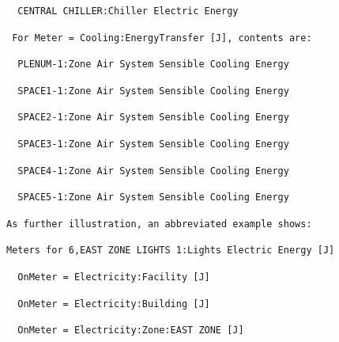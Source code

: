 \begin{lstlisting}
  CENTRAL CHILLER:Chiller Electric Energy
\end{lstlisting}

\begin{lstlisting}
 For Meter = Cooling:EnergyTransfer [J], contents are:
\end{lstlisting}

\begin{lstlisting}
  PLENUM-1:Zone Air System Sensible Cooling Energy
\end{lstlisting}

\begin{lstlisting}
  SPACE1-1:Zone Air System Sensible Cooling Energy
\end{lstlisting}

\begin{lstlisting}
  SPACE2-1:Zone Air System Sensible Cooling Energy
\end{lstlisting}

\begin{lstlisting}
  SPACE3-1:Zone Air System Sensible Cooling Energy
\end{lstlisting}

\begin{lstlisting}
  SPACE4-1:Zone Air System Sensible Cooling Energy
\end{lstlisting}

\begin{lstlisting}
  SPACE5-1:Zone Air System Sensible Cooling Energy
\end{lstlisting}

\begin{lstlisting}
As further illustration, an abbreviated example shows:
\end{lstlisting}

\begin{lstlisting}
Meters for 6,EAST ZONE LIGHTS 1:Lights Electric Energy [J]
\end{lstlisting}

\begin{lstlisting}
  OnMeter = Electricity:Facility [J]
\end{lstlisting}

\begin{lstlisting}
  OnMeter = Electricity:Building [J]
\end{lstlisting}

\begin{lstlisting}
  OnMeter = Electricity:Zone:EAST ZONE [J]
\end{lstlisting}

